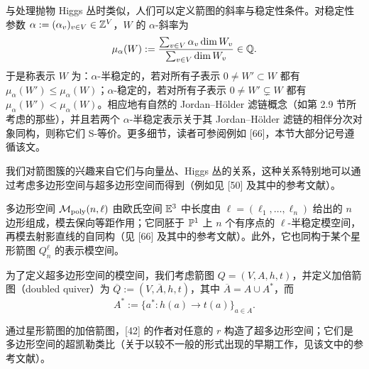 
与处理抛物 Higgs 丛时类似，人们可以定义箭图的斜率与稳定性条件。对稳定性参数 $\alpha := (\alpha_v)_{v\in V}\in\mathbb{Z}^V$，$W$ 的 $\alpha$-斜率为
\[
\mu_{\alpha}(W):=\frac{\sum_{v\in V}\alpha_v\dim W_v}{\sum_{v\in V}\dim W_v}\in\mathbb{Q}.
\]
于是称表示 $W$ 为：$\alpha$-半稳定的，若对所有子表示 $0\neq W'\subset W$ 都有 $\mu_{\alpha}(W')\leqslant\mu_{\alpha}(W)$；$\alpha$-稳定的，若对所有子表示 $0\neq W'\subsetneq W$ 都有 $\mu_{\alpha}(W')<\mu_{\alpha}(W)$。相应地有自然的 Jordan--Hölder 滤链概念（如第 2.9 节所考虑的那些），并且若两个 $\alpha$-半稳定表示关于其 Jordan--Hölder 滤链的相伴分次对象同构，则称它们 S-等价。更多细节，读者可参阅例如 [66]，本节大部分记号遵循该文。


我们对箭图簇的兴趣来自它们与向量丛、Higgs 丛的关系，这种关系特别地可以通过考虑多边形空间与超多边形空间而得到（例如见 [50] 及其中的参考文献）。

多边形空间 $\mathcal{M}_{\mathrm{poly}}(n,\ell)$ 由欧氏空间 $\mathbb{E}^3$ 中长度由 $\ell=(\ell_1,\dots,\ell_n)$ 给出的 $n$ 边形组成，模去保向等距作用；它同胚于 $\mathbb{P}^1$ 上 $n$ 个有序点的 $\ell$-半稳定模空间，再模去射影直线的自同构（见 [66] 及其中的参考文献）。此外，它也同构于某个星形箭图 $Q^{\ell}_n$ 的表示模空间。


为了定义超多边形空间的模空间，我们考虑箭图 $Q=(V,A,h,t)$，并定义加倍箭图（doubled quiver）为 $\overline{Q} := (V,\overline{A},h,t)$，其中 $\overline{A}=A\cup A^*$，而
\[
A^* := \{a^* : h(a)\to t(a)\}_{a\in A}.
\]

通过星形箭图的加倍箭图，[42] 的作者对任意的 $r$ 构造了超多边形空间；它们是多边形空间的超凯勒类比（关于以较不一般的形式出现的早期工作，见该文中的参考文献）。

